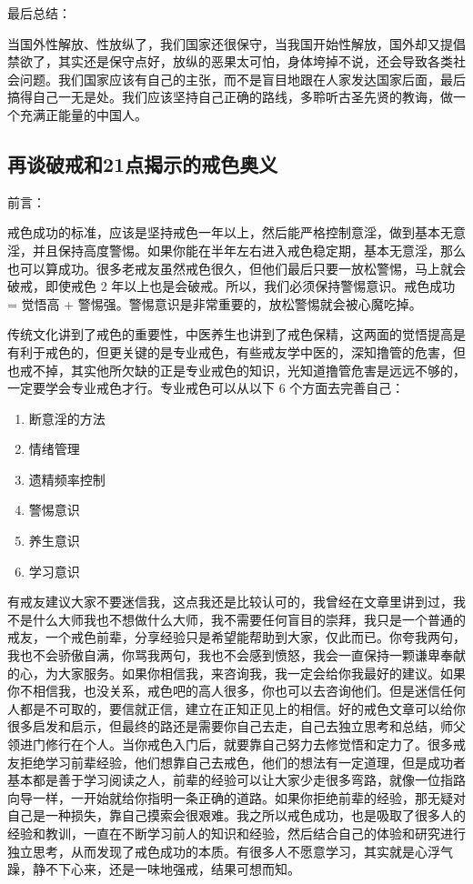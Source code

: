 \documentclass[fontset=founder]{ctexart}
\begin{document}
最后总结：

当国外性解放、性放纵了，我们国家还很保守，当我国开始性解放，国外却又提倡禁欲了，其实还是保守点好，放纵的恶果太可怕，身体垮掉不说，还会导致各类社会问题。我们国家应该有自己的主张，而不是盲目地跟在人家发达国家后面，最后搞得自己一无是处。我们应该坚持自己正确的路线，多聆听古圣先贤的教诲，做一个充满正能量的中国人。

\subsection{再谈破戒和21点揭示的戒色奥义}

前言：

戒色成功的标准，应该是坚持戒色一年以上，然后能严格控制意淫，做到基本无意淫，并且保持高度警惕。如果你能在半年左右进入戒色稳定期，基本无意淫，那么也可以算成功。很多老戒友虽然戒色很久，但他们最后只要一放松警惕，马上就会破戒，即使戒色 2 年以上也是会破戒。所以，我们必须保持警惕意识。戒色成功 = 觉悟高 + 警惕强。警惕意识是非常重要的，放松警惕就会被心魔吃掉。

传统文化讲到了戒色的重要性，中医养生也讲到了戒色保精，这两面的觉悟提高是有利于戒色的，但更关键的是专业戒色，有些戒友学中医的，深知撸管的危害，但也戒不掉，其实他所欠缺的正是专业戒色的知识，光知道撸管危害是远远不够的，一定要学会专业戒色才行。专业戒色可以从以下 6 个方面去完善自己：

\begin{multicols}{2}
    \begin{enumerate}
        \item 断意淫的方法
        \item 情绪管理
        \item 遗精频率控制
        \item 警惕意识
        \item 养生意识
        \item 学习意识
    \end{enumerate}
\end{multicols}

有戒友建议大家不要迷信我，这点我还是比较认可的，我曾经在文章里讲到过，我不是什么大师我也不想做什么大师，我不需要任何盲目的崇拜，我只是一个普通的戒友，一个戒色前辈，分享经验只是希望能帮助到大家，仅此而已。你夸我两句，我也不会骄傲自满，你骂我两句，我也不会感到愤怒，我会一直保持一颗谦卑奉献的心，为大家服务。如果你相信我，来咨询我，我一定会给你我最好的建议。如果你不相信我，也没关系，戒色吧的高人很多，你也可以去咨询他们。但是迷信任何人都是不可取的，要信就正信，建立在正知正见上的相信。好的戒色文章可以给你很多启发和启示，但最终的路还是需要你自己去走，自己去独立思考和总结，师父领进门修行在个人。当你戒色入门后，就要靠自己努力去修觉悟和定力了。很多戒友拒绝学习前辈经验，他们想靠自己去戒色，他们的想法有一定道理，但是成功者基本都是善于学习阅读之人，前辈的经验可以让大家少走很多弯路，就像一位指路向导一样，一开始就给你指明一条正确的道路。如果你拒绝前辈的经验，那无疑对自己是一种损失，靠自己摸索会很艰难。我之所以戒色成功，也是吸取了很多人的经验和教训，一直在不断学习前人的知识和经验，然后结合自己的体验和研究进行独立思考，从而发现了戒色成功的本质。有很多人不愿意学习，其实就是心浮气躁，静不下心来，还是一味地强戒，结果可想而知。
\end{document}
